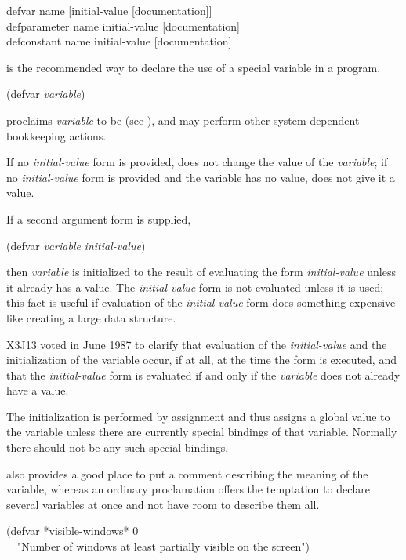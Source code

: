 \begin{defmac}
defvar name [initial-value [documentation]] \\
defparameter name initial-value [documentation] \\
defconstant name initial-value [documentation]

 is the recommended way to declare the use
of a special variable in a program.
\begin{lisp}
(defvar \emph{variable})
\end{lisp}
proclaims \emph{variable} to be  (see ),
and may perform other system-dependent bookkeeping actions.

If no \emph{initial-value} form is provided, 
does not change the value of the \emph{variable};
if no \emph{initial-value} form is provided and the variable
has no value,  does not give it a value.

If a second argument form is supplied,
\begin{lisp}
(defvar \emph{variable} \emph{initial-value})
\end{lisp}
then \emph{variable} is initialized to the result of evaluating the form
\emph{initial-value} unless it already has a value.  The \emph{initial-value} form
is not evaluated unless it is used; this fact is useful if
evaluation of the \emph{initial-value} form does something
expensive like creating a large data structure.

\begin{newer}
X3J13 voted in June 1987  to clarify that
evaluation of the \emph{initial-value} and the initialization of the
variable occur, if at all, at the time the  form is executed,
and that the \emph{initial-value} form is evaluated
if and only if the \emph{variable} does not already have a value.
\end{newer}
The initialization is
performed by assignment and thus assigns a global value to the variable
unless there are currently special bindings of that variable.
Normally there should not be any such special bindings.

 also provides a good place to put a comment describing the
meaning of the variable, whereas an ordinary  proclamation
offers the
temptation to declare several variables at once and not have room to
describe them all.
\begin{lisp}
(defvar *visible-windows* 0 \\
~~"Number of windows at least partially visible on the screen")
\end{lisp}


\end{defmac}
